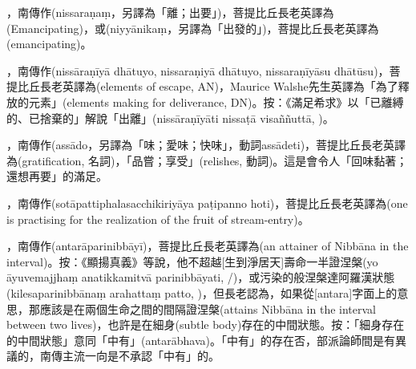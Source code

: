 \startitemgroup[noteitems]
\item{}，南傳作(nissaraṇaṃ，另譯為「離；出要」)，菩提比丘長老英譯為(Emancipating)，或(niyyānikaṃ，另譯為「出發的」)，菩提比丘長老英譯為(emancipating)。
\item{}，南傳作(nissāraṇīyā dhātuyo, nissaraṇiyā dhātuyo, nissaraṇīyāsu dhātūsu)，菩提比丘長老英譯為(elements of escape, AN)，Maurice Walshe先生英譯為「為了釋放的元素」(elements making for deliverance, DN)。按：《滿足希求》以「已離縛的、已捨棄的」解說「出離」(nissāraṇīyāti nissaṭā visaññuttā, )。
\stopitemgroup

\startitemgroup[noteitems]
\item{}，南傳作(assādo，另譯為「味；愛味；快味」，動詞assādeti)，菩提比丘長老英譯為(gratification, 名詞)，「品嘗；享受」(relishes, 動詞)。這是會令人「回味黏著；還想再要」的滿足。
\stopitemgroup

\startitemgroup[noteitems]
\item{}，南傳作(sotāpattiphalasacchikiriyāya paṭipanno hoti)，菩提比丘長老英譯為(one is practising for the realization of the fruit of stream-entry)。
\stopitemgroup

\startitemgroup[noteitems]
\item{}，南傳作(antarāparinibbāyī)，菩提比丘長老英譯為(an attainer of Nibbāna in the interval)。按：《顯揚真義》等說，他不超越[生到淨居天]壽命一半證涅槃(yo āyuvemajjhaṃ anatikkamitvā parinibbāyati, /)，或污染的般涅槃達阿羅漢狀態(kilesaparinibbānaṃ arahattaṃ patto, )，但長老認為，如果從[antara]字面上的意思，那應該是在兩個生命之間的間隔證涅槃(attains Nibbāna in the interval between two lives)，也許是在細身(subtle body)存在的中間狀態。按：「細身存在的中間狀態」意同「中有」(antarābhava)。「中有」的存在否，部派論師間是有異議的，南傳主流一向是不承認「中有」的。
\stopitemgroup

